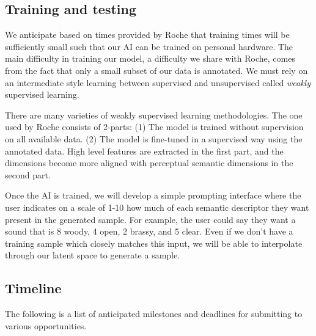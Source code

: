 \documentclass{article}
\begin{document}
\subsection{Training and testing}

We anticipate based on times provided by Roche that training times will be sufficiently small such that our AI can be trained on personal hardware. \cite{Roche2020} The main difficulty in training our model, a difficulty we share with Roche, comes from the fact that only a small subset of our data is annotated. We must rely on an intermediate style learning between supervised and unsupervised called \textit{weakly} supervised learning. \cite{Zhou2017}

There are many varieties of weakly supervised learning methodologies. The one used by Roche consists of 2-parts: (1) The model is trained without supervision on all available data. (2) The model is fine-tuned in a supervised way using the annotated data. \cite{Roche2020} High level features are extracted in the first part, and the dimensions become more aligned with perceptual semantic dimensions in the second part. \cite{Esling2018}

Once the AI is trained, we will develop a simple prompting interface where the user indicates on a scale of 1-10 how much of each semantic descriptor they want present in the generated sample. For example, the user could say they want a sound that is 8 woody, 4 open, 2 brassy, and 5 clear. Even if we don't have a training sample which closely matches this input, we will be able to interpolate through our latent space to generate a sample. \cite{Tatar2021}

\subsection{Timeline}

The following is a list of anticipated milestones and deadlines for submitting to various opportunities.
\end{document}
